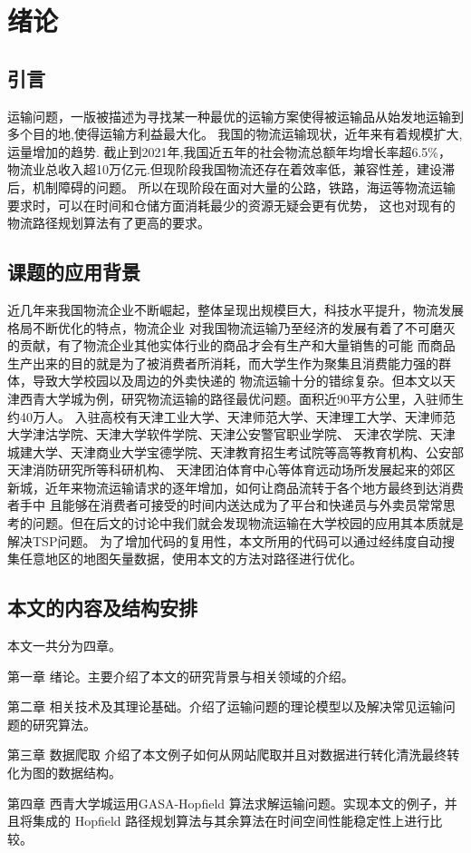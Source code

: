 \chapter{绪论}

\section{引言}

运输问题，一版被描述为寻找某一种最优的运输方案使得被运输品从始发地运输到多个目的地,使得运输方利益最大化。
我国的物流运输现状，近年来有着规模扩大,运量增加的趋势. 截止到2021年,我国近五年的社会物流总额年均增长率超6.5\%，
物流业总收入超10万亿元.但现阶段我国物流还存在着效率低，兼容性差，建设滞后，机制障碍的问题。
所以在现阶段在面对大量的公路，铁路，海运等物流运输要求时，可以在时间和仓储方面消耗最少的资源无疑会更有优势，
这也对现有的物流路径规划算法有了更高的要求。
\section{课题的应用背景}
近几年来我国物流企业不断崛起，整体呈现出规模巨大，科技水平提升，物流发展格局不断优化的特点，物流企业
对我国物流运输乃至经济的发展有着了不可磨灭的贡献，有了物流企业其他实体行业的商品才会有生产和大量销售的可能
而商品生产出来的目的就是为了被消费者所消耗，而大学生作为聚集且消费能力强的群体，导致大学校园以及周边的外卖快递的
物流运输十分的错综复杂。但本文以天津西青大学城为例，研究物流运输的路径最优问题。面积近90平方公里，入驻师生约40万人。
入驻高校有天津工业大学、天津师范大学、天津理工大学、天津师范大学津沽学院、天津大学软件学院、天津公安警官职业学院、
天津农学院、天津城建大学、天津商业大学宝德学院、天津教育招生考试院等高等教育机构、公安部天津消防研究所等科研机构、
天津团泊体育中心等体育远动场所发展起来的郊区新城，近年来物流运输请求的逐年增加，如何让商品流转于各个地方最终到达消费者手中
且能够在消费者可接受的时间内送达成为了平台和快递员与外卖员常常思考的问题。但在后文的讨论中我们就会发现物流运输在大学校园的应用其本质就是解决TSP问题。
为了增加代码的复用性，本文所用的代码可以通过经纬度自动搜集任意地区的地图矢量数据，使用本文的方法对路径进行优化。
\section{本文的内容及结构安排}
本文一共分为四章。
\par
第一章 绪论。主要介绍了本文的研究背景与相关领域的介绍。
\par
第二章 相关技术及其理论基础。介绍了运输问题的理论模型以及解决常见运输问题的研究算法。
\par
第三章 数据爬取 介绍了本文例子如何从网站爬取并且对数据进行转化清洗最终转化为图的数据结构。
\par
第四章 西青大学城运用GASA-Hopfield 算法求解运输问题。实现本文的例子，并且将集成的 Hopfield 路径规划算法与其余算法在时间空间性能稳定性上进行比较。


